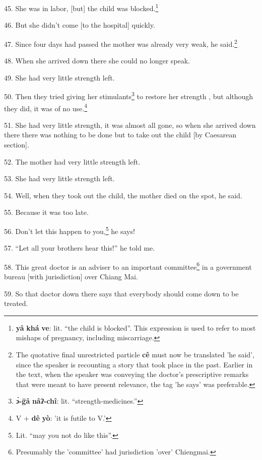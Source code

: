 45. She was in labor, [but] the child was blocked.\footnote{\textbf{yâ} \textbf{khá} \textbf{ve}: lit. ``the child is blocked''. This expression is used to refer to most mishaps of pregnancy, including miscarriage.}

46. But she didn't come [to the hospital] quickly.

47. Since four days had passed the mother was already very weak, he said.\footnote{The quotative final unrestricted particle \textbf{cê} must now be translated 'he said', since the speaker is recounting a story that took place in the past. Earlier in the text, when the speaker was conveying the doctor's prescriptive remarks that were meant to have present relevance, the tag 'he says' was preferable.}

48. When she arrived down there she could no longer speak.

49. She had very little strength left.

50. Then they tried giving her stimulants\footnote{\textbf{ɔ̀-g̈â} \textbf{nâʔ-chî}: lit. ``strength-medicines.''} to restore her strength , but although
they did, it was of no use.\footnote{V + \textbf{dê} \textbf{yò}: 'it is futile to V.'}

51. She had very little strength, it was almost all gone, so when she arrived down
there there was nothing to be done but to take out the child [by Caesarean section].

52. The mother had very little strength left.

53. She had very little strength left.

54. Well, when they took out the child, the mother died on the spot, he said.

55. Because it was too late.

56. Don't let this happen to you,\footnote{Lit. ``may you not do like this''.} he says!

57. ``Let all your brothers hear this!'' he told me.

58. This great doctor is an adviser to an important committee\footnote{Presumably the 'committee' had jurisdiction 'over' Chiengmai.} in a government
bureau [with jurisdiction] over Chiang Mai.

59. So that doctor down there says that everybody should come down to be treated.

